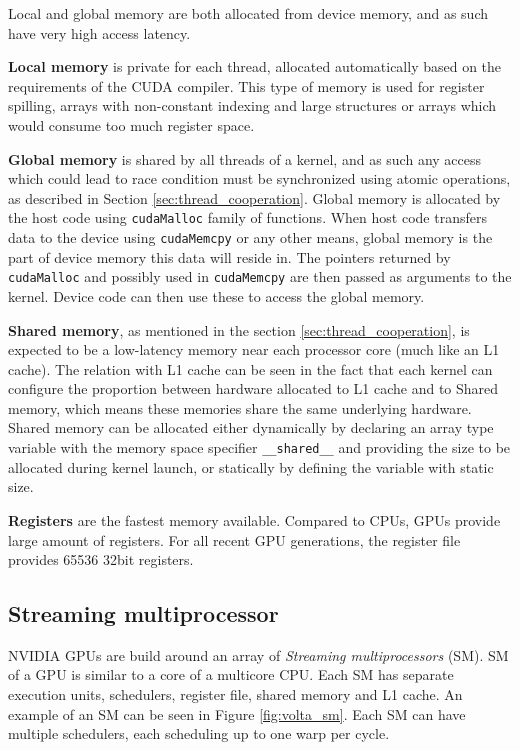 Local and global memory are both allocated from device memory, and as such have very high access latency. 

\textbf{Local memory} is private for each thread, allocated automatically based on the requirements of the CUDA compiler. This type of memory is used for register spilling, arrays with non-constant indexing and large structures or arrays which would consume too much register space. 

\textbf{Global memory} is shared by all threads of a kernel, and as such any access which could lead to race condition must be synchronized using atomic operations, as described in Section \ref{sec:thread_cooperation}. Global memory is allocated by the host code using \texttt{cudaMalloc} family of functions. When host code transfers data to the device using \texttt{cudaMemcpy} or any other means, global memory is the part of device memory this data will reside in. The pointers returned by \texttt{cudaMalloc} and possibly used in \texttt{cudaMemcpy} are then passed as arguments to the kernel. Device code can then use these to access the global memory. 

\textbf{Shared memory}, as mentioned in the section \ref{sec:thread_cooperation}, is expected to be a low-latency memory near each processor core (much like an L1 cache). The relation with L1 cache can be seen in the fact that each kernel can configure the proportion between hardware allocated to L1 cache and to Shared memory, which means these memories share the same underlying hardware. Shared memory can be allocated either dynamically by declaring an array type variable with the memory space specifier \texttt{\_\_shared\_\_} and providing the size to be allocated during kernel launch, or statically by defining the variable with static size.


\textbf{Registers} are the fastest memory available. Compared to CPUs, GPUs provide large amount of registers. For all recent GPU generations, the register file provides 65536 32bit registers. 

\subsection{Streaming multiprocessor}
\label{sec:sm}
NVIDIA GPUs are build around an array of \textit{Streaming multiprocessors} (SM). SM of a GPU is similar to a core of a multicore CPU. Each SM has separate execution units, schedulers, register file, shared memory and L1 cache. An example of an SM can be seen in Figure \ref{fig:volta_sm}. Each SM can have multiple schedulers, each scheduling up to one warp per cycle. 

